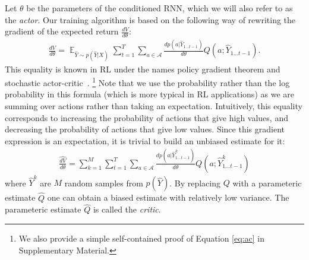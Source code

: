 \documentclass{article} %
\DeclareMathOperator*{\Exp}{\mathbb{E}}
\begin{document}
Let $\theta$ be the parameters of the conditioned RNN, which we will also refer to as the \textit{actor}.
Our training algorithm is based on the following way of rewriting the gradient 
of the expected return $\frac{dV}{d\theta}$:
 \begin{align}
    \frac{dV}{d\theta} = 
    \Exp_{\hat{Y} \sim p(\hat{Y}|X)} 
    \sum\limits_{t=1}^T
    \sum\limits_{a \in \mathcal{A}}
    \frac{dp(a|\hat{Y}_{1 \ldots t - 1})}{d\theta}
    Q(a;\hat{Y}_{1 \ldots t - 1})
    \label{eq:ac}.
\end{align}
This equality is known in RL under the names policy gradient theorem \citep{sutton1999policy}
and stochastic actor-critic~\citep{sutton1984temporal}.
\footnote{We also provide a simple self-contained proof of Equation \eqref{eq:ac} in Supplementary Material.}
Note that we use the probability rather than the log probability in this formula 
(which is more typical in RL applications) as we are summing over actions rather than taking an expectation.  
Intuitively, this equality corresponds to increasing the probability of actions 
that give high values, and decreasing the probability of actions that give low values. 
Since this gradient expression is an expectation,
it is trivial to build an unbiased estimate for it:
\begin{align}
    \widehat{\frac{dV}{d\theta}} = 
    \sum\limits_{k=1}^M
    \sum\limits_{t=1}^T
    \sum\limits_{a \in \mathcal{A}}
    \frac{dp(a|\hat{Y}^k_{1 \ldots t - 1})}{d\theta}
    Q(a;\hat{Y}^k_{1 \ldots t - 1})
    \label{eq:actor_critic}
\end{align}
where $\hat{Y}^k$ are $M$ random samples from $p(\hat{Y})$. By replacing $Q$
with a parameteric estimate $\hat{Q}$ one can obtain a biased estimate with
relatively low variance. The parameteric estimate $\hat{Q}$ is
called the \textit{critic}.
\end{document}
